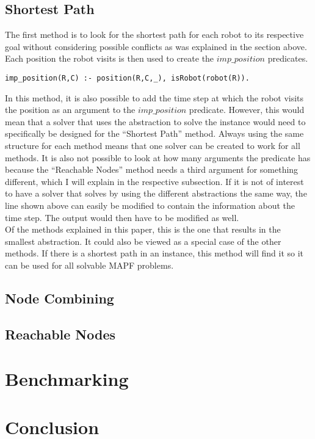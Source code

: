 \documentclass[runningheads]{llncs}
\begin{document}
\subsection{Shortest Path}
The first method is to look for the shortest path for each robot to its respective goal without considering possible conflicts as was explained in the section above. Each position the robot visits is then used to create the $imp\_position$ predicates. 
\begin{verbatim}
imp_position(R,C) :- position(R,C,_), isRobot(robot(R)).
\end{verbatim}
In this method, it is also possible to add the time step at which the robot visits the position as an argument to the $imp\_position$ predicate. However, this would mean that a solver that uses the abstraction to solve the instance would need to specifically
be designed for the ``Shortest Path'' method. Always using the same structure for each method means that one solver can be created to work for all methods. It is also not possible to look at how many arguments the predicate has because the 
``Reachable Nodes'' method needs a third argument for something different, which I will explain in the respective subsection. If it is not of interest to have a solver that solves by using the different abstractions the same way, the line shown above can 
easily be modified to contain the information about the time step. The output would then have to be modified as well. \\
Of the methods explained in this paper, this is the one that results in the smallest abstraction. It could also be viewed as a special case of the other methods. If there is a shortest path in an instance, this method will find it so it can be used for all solvable
MAPF problems.
\subsection{Node Combining}
\subsection{Reachable Nodes}

\section{Benchmarking}

\section{Conclusion}
\end{document}
